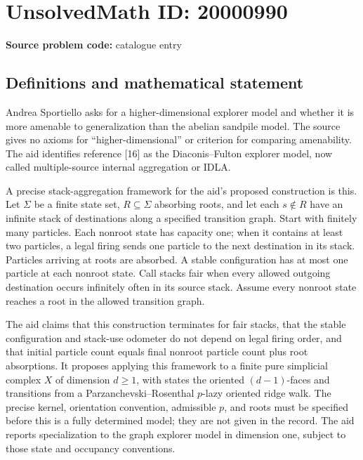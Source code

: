 \documentclass[11pt]{article}
\begin{document}
\section*{UnsolvedMath ID: 20000990}
\textbf{Source problem code:} catalogue entry
\subsection{Definitions and mathematical statement}
Andrea Sportiello asks for a higher-dimensional explorer model and whether it is more amenable to generalization than the abelian sandpile model. The source gives no axioms for ``higher-dimensional'' or criterion for comparing amenability. The aid identifies reference [16] as the Diaconis--Fulton explorer model, now called multiple-source internal aggregation or IDLA.

A precise stack-aggregation framework for the aid's proposed construction is this. Let $\Sigma$ be a finite state set, $R\subseteq\Sigma$ absorbing roots, and let each $s\notin R$ have an infinite stack of destinations along a specified transition graph. Start with finitely many particles. Each nonroot state has capacity one; when it contains at least two particles, a legal firing sends one particle to the next destination in its stack. Particles arriving at roots are absorbed. A stable configuration has at most one particle at each nonroot state. Call stacks fair when every allowed outgoing destination occurs infinitely often in its source stack. Assume every nonroot state reaches a root in the allowed transition graph.

The aid claims that this construction terminates for fair stacks, that the stable configuration and stack-use odometer do not depend on legal firing order, and that initial particle count equals final nonroot particle count plus root absorptions. It proposes applying this framework to a finite pure simplicial complex $X$ of dimension $d\geq1$, with states the oriented $(d-1)$-faces and transitions from a Parzanchevski--Rosenthal $p$-lazy oriented ridge walk. The precise kernel, orientation convention, admissible $p$, and roots must be specified before this is a fully determined model; they are not given in the record. The aid reports specialization to the graph explorer model in dimension one, subject to those state and occupancy conventions.
\end{document}
